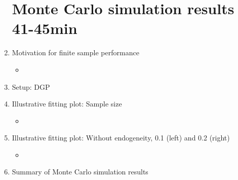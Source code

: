 \documentclass[12pt]{article}
\begin{document}
\begin{enumerate}
\section{Monte Carlo simulation results 41-45min}
    \item Motivation for finite sample performance
    \begin{itemize}
        \item 
    \end{itemize}
    \item Setup: DGP
    \item Illustrative fitting plot: Sample size
    \begin{itemize}
        \item 
    \end{itemize}
    \item Illustrative fitting plot: Without endogeneity, 0.1 (left) and 0.2 (right)
    \begin{itemize}
        \item 
    \end{itemize}
    \item Summary of Monte Carlo simulation results

\end{enumerate}
\end{document}
